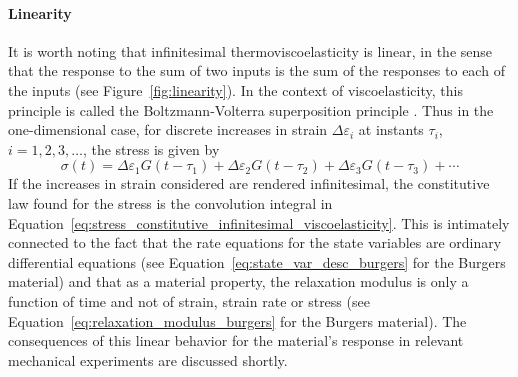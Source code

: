 \paragraph{Linearity}
It is worth noting that infinitesimal thermoviscoelasticity is linear, in the sense that the response to the sum of two inputs is the sum of the responses to each of the inputs (see Figure~\ref{fig:linearity}).
In the context of viscoelasticity, this principle is called the Boltzmann-Volterra superposition principle \citep{wardIntroductionMechanicalProperties2004}.
Thus in the one-dimensional case, for discrete increases in strain $\Delta \varepsilon_i$ at instants $\tau_i$, $i=1,2,3,\dots$, the stress is given by
\begin{equation}
	\sigma (t) = \Delta \varepsilon_1 G(t - \tau_1) + \Delta \varepsilon_2 G(t - \tau_2) + \Delta \varepsilon_3 G(t - \tau_3) + \cdots
\end{equation}
If the increases in strain considered are rendered infinitesimal, the constitutive law found for the stress is the convolution integral in Equation~\eqref{eq:stress_constitutive_infinitesimal_viscoelasticity}.
This is intimately connected to the fact that the rate equations for the state variables are ordinary differential equations (see Equation~\eqref{eq:state_var_desc_burgers} for the Burgers material) and that as a material property, the relaxation modulus is only a function of time and not of strain, strain rate or stress (see Equation~\eqref{eq:relaxation_modulus_burgers} for the Burgers material).
The consequences of this linear behavior for the material's response in relevant mechanical experiments are discussed shortly.

